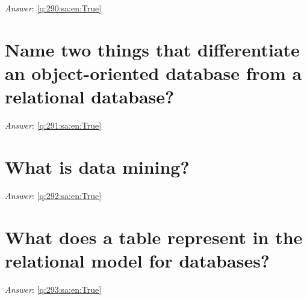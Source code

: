 \documentclass[a4paper,11pt,oneside]{book}
\begin{document}
\begin{sloppypar}
\label{q:290:sa:en:False}

\vspace{2cm}

\noindent\makebox[\textwidth]{\hrulefill}

\vspace{1cm}

\textit{Answer}: \autoref{q:290:sa:en:True}



\section{Name two things that differentiate an object-oriented database from a relational database?}

\label{q:291:sa:en:False}

\vspace{2cm}

\noindent\makebox[\textwidth]{\hrulefill}

\vspace{1cm}

\textit{Answer}: \autoref{q:291:sa:en:True}



\section{What is data mining?}

\label{q:292:sa:en:False}

\vspace{2cm}

\noindent\makebox[\textwidth]{\hrulefill}

\vspace{1cm}

\textit{Answer}: \autoref{q:292:sa:en:True}



\section{What does a table represent in the relational model for databases?}

\label{q:293:sa:en:False}

\vspace{2cm}

\noindent\makebox[\textwidth]{\hrulefill}

\vspace{1cm}

\textit{Answer}: \autoref{q:293:sa:en:True}




\end{sloppypar}
\end{document}
